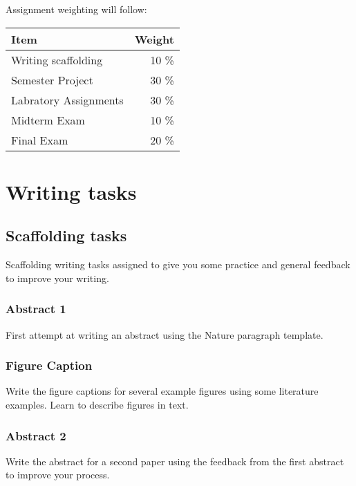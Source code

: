 \documentclass[11pt,]{article}
\begin{document}
Assignment weighting will follow:

\begin{longtable}[]{@{}lr@{}}
\toprule()
Item & Weight \\
\midrule()
\endhead
Writing scaffolding & 10 \% \\
Semester Project & 30 \% \\
Labratory Assignments & 30 \% \\
Midterm Exam & 10 \% \\
Final Exam & 20 \% \\
\bottomrule()
\end{longtable}

\newpage

\hypertarget{writing-tasks}{%
\section{Writing tasks}\label{writing-tasks}}

\hypertarget{scaffolding-tasks}{%
\subsection{Scaffolding tasks}\label{scaffolding-tasks}}

Scaffolding writing tasks assigned to give you some practice and general
feedback to improve your writing.

\hypertarget{abstract-1}{%
\subsubsection{Abstract 1}\label{abstract-1}}

First attempt at writing an abstract using the Nature paragraph
template.

\hypertarget{figure-caption}{%
\subsubsection{Figure Caption}\label{figure-caption}}

Write the figure captions for several example figures using some
literature examples. Learn to describe figures in text.

\hypertarget{abstract-2}{%
\subsubsection{Abstract 2}\label{abstract-2}}

Write the abstract for a second paper using the feedback from the first
abstract to improve your process.
\end{document}
